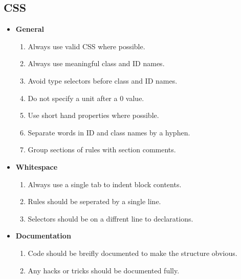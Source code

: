 \documentclass[11pt,a4paper]{article}
\begin{document}
\subsection{CSS}
\begin{itemize}
\item \textbf{General}
	\begin{enumerate}
	\item Always use valid CSS where possible.
    \item Always use meaningful class and ID names.
    \item Avoid type selectors before class and ID names.
    \item Do not specify a unit after a 0 value.
    \item Use short hand properties where possible.
    \item Separate words in ID and class names by a hyphen.
    \item Group sections of rules with section comments.
	\end{enumerate}
\item \textbf{Whitespace}
	\begin{enumerate}
    \item Always use a single tab to indent block contents.
    \item Rules should be seperated by a single line.
    \item Selectors should be on a diffrent line to declarations.
	\end{enumerate}
\item \textbf{Documentation}
	\begin{enumerate}
	\item Code should be breifly documented to make the structure obvious.
    \item Any hacks or tricks should be documented fully.
	\end{enumerate}
\end{itemize}
\end{document}
